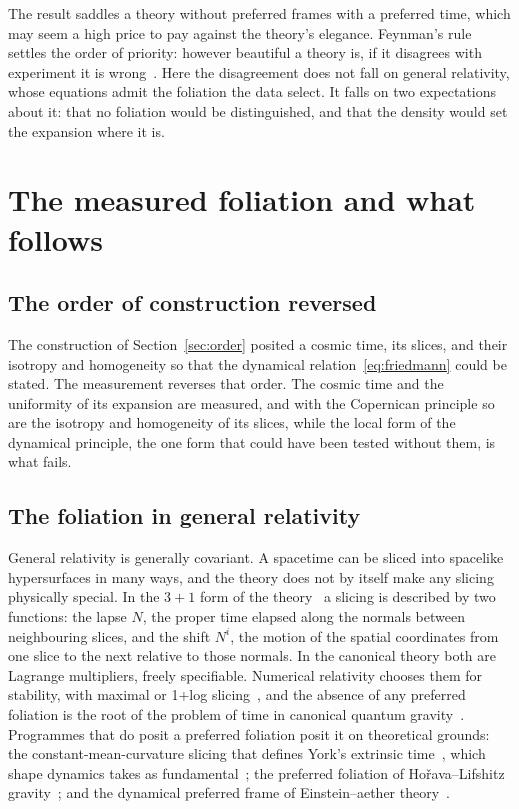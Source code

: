 \documentclass[twocolumn]{aastex701}
\begin{document}
The result saddles a theory without preferred frames with a preferred time, which may seem a high price to pay against the theory's elegance. Feynman's rule settles the order of priority: however beautiful a theory is, if it disagrees with experiment it is wrong~\citep{Feynman1965}. Here the disagreement does not fall on general relativity, whose equations admit the foliation the data select. It falls on two expectations about it: that no foliation would be distinguished, and that the density would set the expansion where it is.

\section{The measured foliation and what follows}\label{sec:follows}

\subsection{The order of construction reversed}

The construction of Section~\ref{sec:order} posited a cosmic time, its slices, and their isotropy and homogeneity so that the dynamical relation~\eqref{eq:friedmann} could be stated. The measurement reverses that order. The cosmic time and the uniformity of its expansion are measured, and with the Copernican principle so are the isotropy and homogeneity of its slices, while the local form of the dynamical principle, the one form that could have been tested without them, is what fails.

\subsection{The foliation in general relativity}

General relativity is generally covariant. A spacetime can be sliced into spacelike hypersurfaces in many ways, and the theory does not by itself make any slicing physically special. In the $3{+}1$ form of the theory~\citep{ADM1962} a slicing is described by two functions: the lapse $N$, the proper time elapsed along the normals between neighbouring slices, and the shift $N^{i}$, the motion of the spatial coordinates from one slice to the next relative to those normals. In the canonical theory both are Lagrange multipliers, freely specifiable. Numerical relativity chooses them for stability, with maximal or 1+log slicing~\citep{BaumgarteShapiro2010}, and the absence of any preferred foliation is the root of the problem of time in canonical quantum gravity~\citep{Kuchar1992, Isham1993}. Programmes that do posit a preferred foliation posit it on theoretical grounds: the constant-mean-curvature slicing that defines York's extrinsic time~\citep{York1972}, which shape dynamics takes as fundamental~\citep{Gomes2011}; the preferred foliation of Ho\v{r}ava--Lifshitz gravity~\citep{Horava2009}; and the dynamical preferred frame of Einstein--aether theory~\citep{Jacobson2001}.
\end{document}
